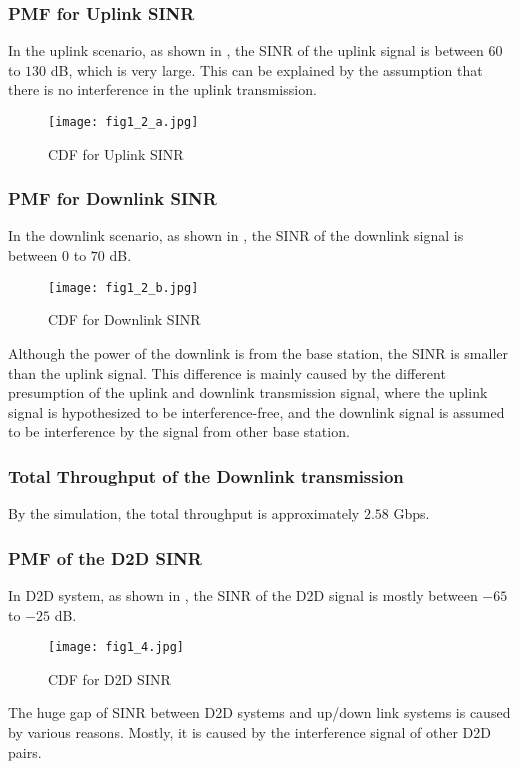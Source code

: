\documentclass[conference]{IEEEtran}
\begin{document}
\subsubsection{PMF for Uplink SINR}
In the uplink scenario, as shown in , the SINR of the uplink signal is between $60$ to $130$ dB, which is very large. This can be explained by the assumption that there is no interference in the uplink transmission.
\begin{figure}[htbp]
    \centering
    \texttt{[image: fig1\_2\_a.jpg]}
    \caption{CDF for Uplink SINR}
    \label{fig:uplink_sinr}
\end{figure}

\subsubsection{PMF for Downlink SINR}
In the downlink scenario, as shown in , the SINR of the downlink signal is between $0$ to $70$ dB.
\begin{figure}[htbp]
    \centering
    \texttt{[image: fig1\_2\_b.jpg]}
    \caption{CDF for Downlink SINR}
    \label{fig:downlink_sinr}
\end{figure}
Although the power of the downlink is from the base station, the SINR is smaller than the uplink signal. This difference is mainly caused by the different presumption of the uplink and downlink transmission signal, where the uplink signal is hypothesized to be interference-free, and the downlink signal is assumed to be interference by the signal from other base station.
\subsubsection{Total Throughput of the Downlink transmission}
By the simulation, the total throughput is approximately $2.58$ Gbps.
\subsubsection{PMF of the D2D SINR}
In D2D system, as shown in , the SINR of the D2D signal is mostly between $-65$ to $-25$ dB.

\begin{figure}[htbp]
    \centering
    \texttt{[image: fig1\_4.jpg]}
    \caption{CDF for D2D SINR}
    \label{fig:d2d_sinr}
\end{figure}
The huge gap of SINR between D2D systems and up/down link systems is caused by various reasons. Mostly, it is caused by the interference signal of other D2D pairs.
\end{document}
